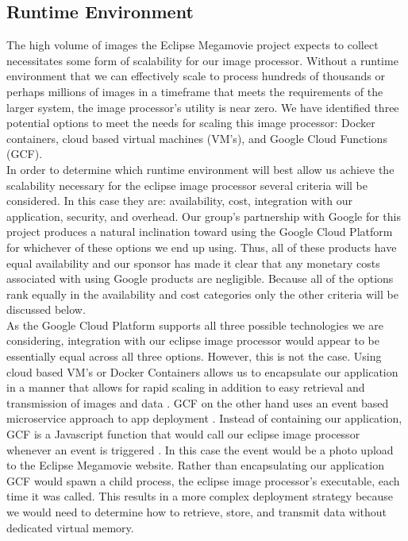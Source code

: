 \documentclass[10pt, onecolumn, draftclsnofoot, letterpaper, compsoc]{IEEEtran}
\begin{document}
\subsection{Runtime Environment}

The high volume of images the Eclipse Megamovie project expects to collect
necessitates some form of scalability for our image processor. Without a runtime
environment that we can effectively scale to process hundreds of thousands or
perhaps millions of images in a timeframe that meets the requirements of the
larger system, the image processor's utility is near zero. We have identified
three potential options to meet the needs for scaling this image processor:
Docker containers, cloud based virtual machines (VM's), and Google Cloud
Functions (GCF).\\

In order to determine which runtime environment will best allow us achieve the
scalability necessary for the eclipse image processor several criteria will be
considered. In this case they are: availability, cost, integration with our
application, security, and overhead. Our group's partnership with Google for
this project produces a natural inclination toward using the Google Cloud
Platform for whichever of these options we end up using. Thus, all of these
products have equal availability and our sponsor has made it clear that any
monetary costs associated with using Google products are negligible. Because all
of the options rank equally in the availability and cost categories only the
other criteria will be discussed below. \\

As the Google Cloud Platform supports all three possible technologies we are
considering, integration with our eclipse image processor would appear to be
essentially equal across all three options. However, this is not the case. Using
cloud based VM's or Docker Containers allows us to encapsulate our application
in a manner that allows for rapid scaling in addition to easy retrieval and
transmission of images and data \cite{docker, gcp}. GCF on the other hand uses
an event based microservice approach to app deployment \cite{gcp}. Instead of
containing our application, GCF is a Javascript function that would call our
eclipse image processor whenever an event is triggered \cite{gcp}. In this case
the event would be a photo upload to the Eclipse Megamovie website. Rather than
encapsulating our application GCF would spawn a child process, the eclipse image
processor's executable, each time it was called. This results in a more complex
deployment strategy because we would need to determine how to retrieve, store,
and transmit data without dedicated virtual memory. \\
\end{document}
